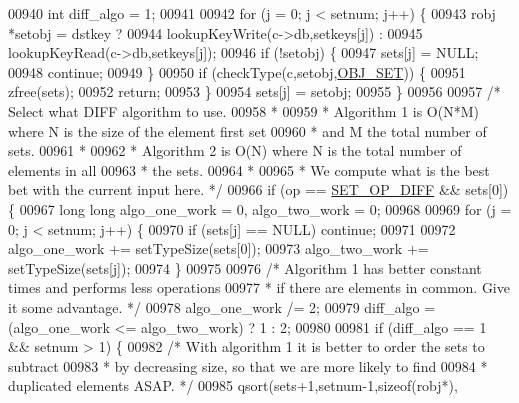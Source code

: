 \begin{DoxyCode}
00940     \textcolor{keywordtype}{int} diff\_algo = 1;
00941 
00942     \textcolor{keywordflow}{for} (j = 0; j < setnum; j++) \{
00943         robj *setobj = dstkey ?
00944             lookupKeyWrite(c->db,setkeys[j]) :
00945             lookupKeyRead(c->db,setkeys[j]);
00946         \textcolor{keywordflow}{if} (!setobj) \{
00947             sets[j] = NULL;
00948             \textcolor{keywordflow}{continue};
00949         \}
00950         \textcolor{keywordflow}{if} (checkType(c,setobj,\hyperlink{server_8h_a8d179375a4aac33d3fa7aa80c8ccc75f}{OBJ\_SET})) \{
00951             zfree(sets);
00952             \textcolor{keywordflow}{return};
00953         \}
00954         sets[j] = setobj;
00955     \}
00956 
00957     \textcolor{comment}{/* Select what DIFF algorithm to use.}
00958 \textcolor{comment}{     *}
00959 \textcolor{comment}{     * Algorithm 1 is O(N*M) where N is the size of the element first set}
00960 \textcolor{comment}{     * and M the total number of sets.}
00961 \textcolor{comment}{     *}
00962 \textcolor{comment}{     * Algorithm 2 is O(N) where N is the total number of elements in all}
00963 \textcolor{comment}{     * the sets.}
00964 \textcolor{comment}{     *}
00965 \textcolor{comment}{     * We compute what is the best bet with the current input here. */}
00966     \textcolor{keywordflow}{if} (op == \hyperlink{server_8h_ad22703ffec4b7bf6cd262099917dc6a1}{SET\_OP\_DIFF} && sets[0]) \{
00967         \textcolor{keywordtype}{long} \textcolor{keywordtype}{long} algo\_one\_work = 0, algo\_two\_work = 0;
00968 
00969         \textcolor{keywordflow}{for} (j = 0; j < setnum; j++) \{
00970             \textcolor{keywordflow}{if} (sets[j] == NULL) \textcolor{keywordflow}{continue};
00971 
00972             algo\_one\_work += setTypeSize(sets[0]);
00973             algo\_two\_work += setTypeSize(sets[j]);
00974         \}
00975 
00976         \textcolor{comment}{/* Algorithm 1 has better constant times and performs less operations}
00977 \textcolor{comment}{         * if there are elements in common. Give it some advantage. */}
00978         algo\_one\_work /= 2;
00979         diff\_algo = (algo\_one\_work <= algo\_two\_work) ? 1 : 2;
00980 
00981         \textcolor{keywordflow}{if} (diff\_algo == 1 && setnum > 1) \{
00982             \textcolor{comment}{/* With algorithm 1 it is better to order the sets to subtract}
00983 \textcolor{comment}{             * by decreasing size, so that we are more likely to find}
00984 \textcolor{comment}{             * duplicated elements ASAP. */}
00985             qsort(sets+1,setnum-1,\textcolor{keyword}{sizeof}(robj*),

\end{DoxyCode}
